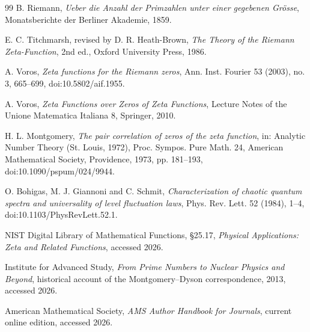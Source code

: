 \documentclass[11pt]{amsart}
\theoremstyle{definition}
\theoremstyle{remark}
\begin{document}
\begin{thebibliography}{99}
B. Riemann, \emph{Ueber die Anzahl der Primzahlen unter einer gegebenen Grösse}, Monatsberichte der Berliner Akademie, 1859.

E. C. Titchmarsh, revised by D. R. Heath-Brown, \emph{The Theory of the Riemann Zeta-Function}, 2nd ed., Oxford University Press, 1986.

A. Voros, \emph{Zeta functions for the Riemann zeros}, Ann. Inst. Fourier 53 (2003), no. 3, 665--699, doi:10.5802/aif.1955.

A. Voros, \emph{Zeta Functions over Zeros of Zeta Functions}, Lecture Notes of the Unione Matematica Italiana 8, Springer, 2010.


H. L. Montgomery, \emph{The pair correlation of zeros of the zeta function}, in: Analytic Number Theory (St. Louis, 1972), Proc. Sympos. Pure Math. 24, American Mathematical Society, Providence, 1973, pp. 181--193, doi:10.1090/pspum/024/9944.

O. Bohigas, M. J. Giannoni and C. Schmit, \emph{Characterization of chaotic quantum spectra and universality of level fluctuation laws}, Phys. Rev. Lett. 52 (1984), 1--4, doi:10.1103/PhysRevLett.52.1.

NIST Digital Library of Mathematical Functions, \S25.17, \emph{Physical Applications: Zeta and Related Functions}, accessed 2026.

Institute for Advanced Study, \emph{From Prime Numbers to Nuclear Physics and Beyond}, historical account of the Montgomery--Dyson correspondence, 2013, accessed 2026.

American Mathematical Society, \emph{AMS Author Handbook for Journals}, current online edition, accessed 2026.
\end{thebibliography}
\end{document}
